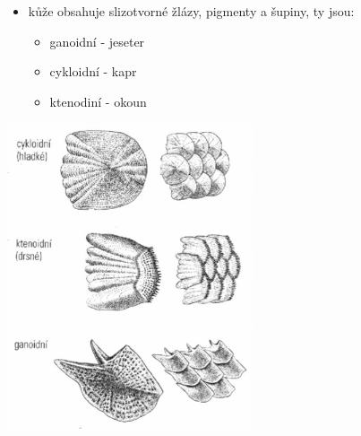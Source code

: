 \documentclass{article}
\begin{document}
\begin{minipage}{0.6\textwidth}\raggedleft
  \begin{itemize}
    \item kůže obsahuje slizotvorné žlázy, pigmenty a šupiny, ty jsou:
    \begin{itemize}
      \item ganoidní - jeseter
      \item cykloidní - kapr
      \item ktenodiní - okoun
    \end{itemize}
  \end{itemize}
\end{minipage}
\hspace{0.5cm}
\noindent\begin{minipage}{0.2\textwidth}
  \includegraphics[width=0.9\linewidth]{šupiny}
\end{minipage}
\end{document}
